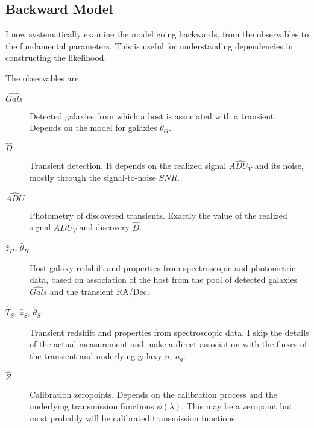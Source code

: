 \documentclass[preprint]{aastex}
\begin{document}
\subsection{Backward Model}
 
I now systematically
examine the model going backwards, from the observables to the fundamental parameters.
This is useful for understanding dependencies in constructing the likelihood.

The observables are:
\begin{description}
\item[$\hat{\mathit{Gals}}$] Detected galaxies from which a host is associated with a transient.
Depends on the model for galaxies $\theta_G$.
\item[$\hat{D}$] Transient detection.  It depends on
the realized signal $\hat{\mathit{ADU}_V}$ and its noise, mostly through the signal-to-noise
$\mathit{SNR}$.
\item[$\hat{\mathit{ADU}}$]  Photometry of discovered transients.  Exactly the value
of the  realized signal $\mathit{ADU}_V$ and discovery $\hat{D}$.
\item[$\hat{z}_H$, $\hat{\theta}_H$] Host galaxy redshift and properties from spectroscopic
and photometric data, based on association
of the host from the pool of detected galaxies $\hat{\mathit{Gals}}$ and the transient RA/Dec.
\item[$\hat{T}_S$, $\hat{z}_S$, $\hat{\theta}_S$] Transient redshift and properties from
spectroscopic data. I skip the details of the actual measurement  and make a direct association
with the fluxes of the transient and underlying galaxy $n$, $n_g$.
\item[$\hat{Z}$] Calibration zeropoints.  Depends on the calibration process
and the underlying transmission functions $\phi(\lambda)$.  This may be a zeropoint
but most probably will be calibrated transmission functions.
\end{description}
\end{document}
